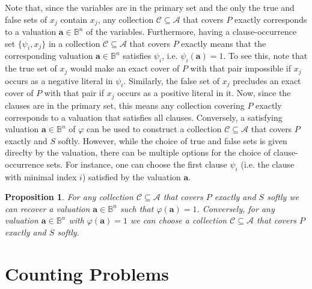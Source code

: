 \documentclass[a4paper]{article}
\newtheorem{proposition}{Proposition}
\renewcommand{\vec}[1]{\boldsymbol{#1}}
\begin{document}
Note that, since the variables are in the primary set and the only the true
and false sets of $x_j$ contain $x_j$, any collection $\mathcal{C} \subseteq
\mathcal{A}$ that
covers $P$ exactly corresponds to a valuation $\vec{a} \in \mathbb{B}^n$ of
the variables. Furthermore, having a clause-occurrence set $\{\psi_i, x_j\}$
in a collection $\mathcal{C} \subseteq \mathcal{A}$ that covers $P$ exactly means that the
corresponding valuation $\vec{a} \in \mathbb{B}^n$ satisfies $\psi_i$, i.e.
$\psi_i(\vec{a}) = 1$. To see this, note that the true set of $x_j$ would make
an exact cover of $P$ with that pair impossible if $x_j$ occurs as a negative
literal in $\psi_i$. Similarly, the false set of $x_j$ precludes an exact
cover of $P$ with that pair if $x_j$ occurs as a positive literal in it.  Now,
since the clauses are in the primary set, this means any collection covering
$P$ exactly corresponds to a valuation that satisfies all clauses. Conversely,
a satisfying valuation $\vec{a} \in \mathbb{B}^n$ of $\varphi$ can be used to
construct a collection $\mathcal{C} \subseteq \mathcal{A}$ that covers $P$
exactly and $S$ softly. However, while the choice of true and false sets is given direclty by
the valuation, there can be multiple options for the choice of
clause-occurrence sets. For instance, one can choose the first clause $\psi_i$
(i.e. the clause with minimal index $i$) satisfied by the valuation $\vec{a}$.
\begin{proposition}
  For any collection $\mathcal{C} \subseteq \mathcal{A}$ that covers $P$
  exactly and $S$ softly we can recover a valuation $\vec{a} \in \mathbb{B}^n$
  such that $\varphi(\vec{a}) = 1$. Conversely, for any valuation $\vec{a} \in
  \mathbb{B}^n$ with $\varphi(\vec{a}) = 1$ we can choose a collection
  $\mathcal{C} \subseteq \mathcal{A}$ that covers $P$ exactly and $S$ softly.
\end{proposition}


\section{Counting Problems}
\end{document}
